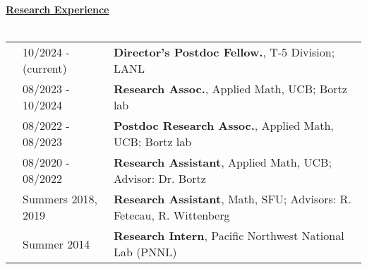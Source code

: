 \documentclass[letterpaper,11pt,oneside]{article}
\newcommand{\headr}[1]{\vspace{10pt}\uline{\Large{\textbf{#1}} \hfill } \\ \vspace{-10pt}\\}
\begin{document}

\headr{Research Experience}

\begin{tabular}{@{} p{0.01cm} @{} p{4cm} @{} p{16cm}@{} }
& 10/2024 - (current)  & 
\textbf{Director's Postdoc Fellow.}, T-5 Division; LANL \\
& 08/2023 - 10/2024  & 
\textbf{Research Assoc.}, Applied Math, UCB; Bortz lab \\
& 08/2022 - 08/2023 & 
\textbf{Postdoc Research Assoc.}, Applied Math, UCB; Bortz lab\\
& 08/2020 - 08/2022  & 
\textbf{Research Assistant}, Applied Math, UCB; 
Advisor: Dr. Bortz \\
& Summers 2018, 2019  & 
\textbf{Research Assistant}, Math, SFU; Advisors: R. Fetecau, R. Wittenberg \\
& Summer 2014  & 
\textbf{Research Intern}, Pacific Northwest National Lab (PNNL) 
\end{tabular}



\end{document}
